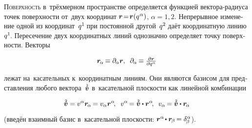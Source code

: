 \begin{otherlanguage}{russian}

\lettrine[lines=2, findent=2pt, nindent=0pt]{П}{оверхность} в~трёхмерном пространстве определяется функцией вектора\hbox{-}радиуса точек поверхности от~двух координат ${\bm{r} \!=\! \bm{r}(q^{\hspace{.1ex}\alpha})}$, ${\alpha = 1, 2}$. Непрерывное изменение одной из координат~${q^1\hspace{-0.25ex}}$ при постоянной другой~${q^2\hspace{-0.25ex}}$ даёт координатную линию~${q^1\hspace{-0.25ex}}$. Пере\-сече\-ние двух координатных линий однозначно определяет точку поверхности. Векторы

\nopagebreak\vspace{-0.5em}\begin{equation*}
\bm{r}_{\hspace{-0.2ex}\alpha} \hspace{-0.16ex} \equiv \partial_{\hspace{-0.1ex}\alpha} \bm{r}
, \;\;
\partial_{\hspace{-0.1ex}\alpha} \hspace{-0.16ex} \equiv \textstyle\frac{\partial \bm{r}}{\partial q^\alpha}
\end{equation*}

\vspace{-0.2em} \noindent лежат на~касательных к~координатным линиям. Они являются базисом для представления любого вектора~$\mathtwoabove{\bm{v}}$ в~касательной плоскости как линейной комбинации

\nopagebreak\vspace{-0.2em}\begin{equation*}
\mathtwoabove{\bm{v}} = v^\alpha \bm{r}_{\hspace{-0.2ex}\alpha} \hspace{-0.16ex} = v_\alpha \bm{r}^\alpha
\hspace{-0.4ex} , \;\;
v^\alpha \hspace{-0.25ex} = \mathtwoabove{\bm{v}} \dotp \bm{r}^\alpha
\hspace{-0.4ex} , \:\;
v_\alpha \hspace{-0.2ex} = \mathtwoabove{\bm{v}} \dotp \bm{r}_{\hspace{-0.2ex}\alpha}
\end{equation*}

\vspace{-0.25em} \noindent (введён взаимный базис в~касательной плоскости: ${\bm{r}^\alpha \hspace{-0.25ex} \dotp \bm{r}_{\hspace{-0.2ex}\beta} \hspace{-0.2ex} = \delta^\alpha_{\hspace{-0.2ex}\beta}}$).


\end{otherlanguage}
